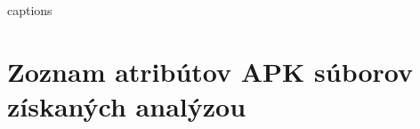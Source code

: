 
%








	


{\csname captions\languagename\endcsname %
\makeatletter %
  \thesis@selectLocale{\thesis@locale}\makeatother
\printbibliography[heading=bibintoc]} %



\appendix %
\chapter{Zoznam atribútov APK súborov získaných analýzou}
%



